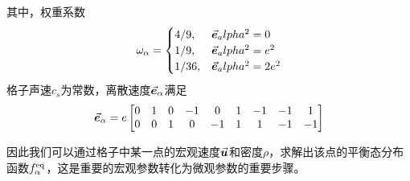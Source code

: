 \documentclass[fontset=fandol]{ctexart}
\numberwithin{equation}{section} %
\begin{document}
其中，权重系数
\begin{equation*}
    \omega_\alpha=\begin{cases}
        4/9, &\va*{e}_alpha^2=0\\
        1/9, &\va*{e}_alpha^2=e^2\\
        1/36, &\va*{e}_alpha^2=2e^2
    \end{cases}
\end{equation*}
格子声速$c_s$为常数，离散速度$\va*{e}_\alpha$满足
\begin{equation*}
    \va*{e}_\alpha=e\begin{bmatrix}
        0 & 1 & 0 & -1 & 0 & 1 & -1 & -1 & 1 \\
        0 & 0 & 1 & 0 & -1 & 1 & 1 & -1 & -1 
    \end{bmatrix}
\end{equation*}

因此我们可以通过格子中某一点的宏观速度$\va*{u}$和密度$\rho$，求解出该点的平衡态分布函数$f_{\alpha}^{\rm eq}$，这是重要的宏观参数转化为微观参数的重要步骤。
\end{document}
